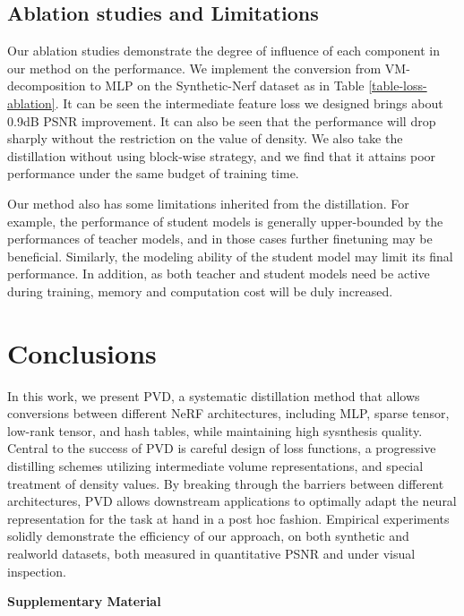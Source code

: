 \documentclass[letterpaper]{article} \usepackage{aaai23}  \usepackage{times}  \usepackage{helvet}  \usepackage{courier}  \usepackage[hyphens]{url}  \usepackage{graphicx} \urlstyle{rm} \def\UrlFont{\rm}  \usepackage{natbib}  \usepackage{caption} \frenchspacing  \setlength{\pdfpagewidth}{8.5in}  \setlength{\pdfpageheight}{11in}  \usepackage{multirow}
\begin{document}
\subsection{Ablation studies and Limitations}
Our ablation studies demonstrate the degree of influence of each component in our method on the performance. We implement the conversion from VM-decomposition to MLP on the Synthetic-Nerf dataset as in Table \ref{table-loss-ablation}. It can be seen the intermediate feature loss we designed brings about 0.9dB PSNR improvement. It can also be seen that the performance will drop sharply without the restriction on the value of density. We also take the distillation without using block-wise strategy, and we find that it attains poor performance under the same budget of training time.


Our method also has some limitations inherited from the distillation. For example, the performance of student models is generally upper-bounded by the performances of teacher models, and in those cases further finetuning may be beneficial. Similarly, the modeling ability of the student model may limit its final performance. In addition, as both teacher and student models need be active during training, memory and computation cost will be duly increased. 


\section{Conclusions}
In this work, we present PVD, a systematic distillation method that allows conversions between different NeRF architectures, including MLP, sparse tensor, low-rank tensor, and hash tables, while maintaining high sysnthesis quality. Central to the success of PVD is careful design of loss functions, a progressive distilling schemes utilizing intermediate volume representations, and special treatment of density values. By breaking through the barriers between different architectures, PVD allows downstream applications to optimally adapt the neural representation for the task at hand in a post hoc fashion. Empirical experiments solidly demonstrate the efficiency of our approach, on both synthetic and realworld datasets, both measured in quantitative PSNR and under visual inspection.


\begin{center}
    \Large
     \textcolor[rgb]{0.,0.18,0.85}{\textbf{Supplementary Material}}
    \\[18pt]
    \normalsize 
\end{center}
\end{document}
